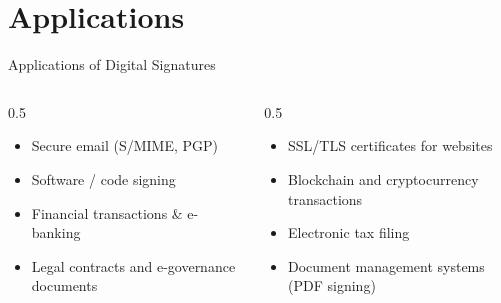 \documentclass[aspectratio=169]{beamer}
\begin{document}
\section{Applications}
\begin{frame}{Applications of Digital Signatures}
  \begin{columns}
    \begin{column}{0.5\textwidth}
      \begin{itemize}
        \item Secure email (S/MIME, PGP)
        \item Software / code signing
        \item Financial transactions \& e-banking
        \item Legal contracts and e-governance documents
      \end{itemize}
    \end{column}
    \begin{column}{0.5\textwidth}
      \begin{itemize}
        \item SSL/TLS certificates for websites
        \item Blockchain and cryptocurrency transactions
        \item Electronic tax filing
        \item Document management systems (PDF signing)
      \end{itemize}
    \end{column}
  \end{columns}
\end{frame}

\end{document}
